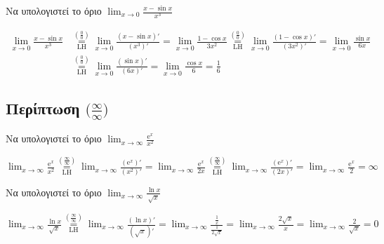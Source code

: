 \begin{example}
  Να υπολογιστεί το όριο $ \lim_{x \to 0} \frac{x- \sin{x}}{x^{3}} $
\end{example}
\begin{solution}
  \begin{align*}
    \lim_{x \to 0} \frac{x - \sin{x}}{x^{3}}
   &\overset{\left(\frac{0}{0}\right)}{\underset{\mathrm{LH}}{=}} \lim_{x \to 0}
   \frac{(x- \sin{x})'}{(x^{3})'} = \lim_{x \to 0} \frac{1 - \cos{x}}{3x^{2}}
   \overset{\left(\frac{0}{0}\right)}{\underset{\mathrm{LH}}{=}} \lim_{x \to 0}
   \frac{(1- \cos{x} )'}{(3x^{2})'} = \lim_{x \to 0} \frac{\sin{x}}{6x} \\
   &\overset{\left(\frac{0}{0}\right)}{\underset{\mathrm{LH}}{=}} \lim_{x \to 0}
   \frac{(\sin{x} )'}{(6x)'} = \lim_{x \to 0} \frac{\cos{x}}{6} = \frac{1}{6} 
  \end{align*}
\end{solution}


\subsection*{Περίπτωση $ \bigl(\frac{\infty}{\infty}\bigr) $}

\begin{example}
  Να υπολογιστεί το όριο $ \lim_{x \to \infty} \frac{\mathrm{e}^{x}}{x^{2}} $
\end{example}
\begin{solution}
  $ \lim_{x \to \infty} \frac{\mathrm{e}^{x}}{x^{2}}
  \overset{\left(\frac{\infty}{\infty}\right)}{\underset{\mathrm{LH}}{=}} \lim_{x \to
  \infty} \frac{(\mathrm{e}^{x} )'}{(x^{2})'} = \lim_{x \to \infty}
  \frac{\mathrm{e}^{x}}{2x}
  \overset{\left(\frac{\infty}{\infty}\right)}{\underset{\mathrm{LH}}{=}} 
  \lim_{x \to \infty} \frac{(\mathrm{e}^{x})'}{(2x)'} = \lim_{x \to \infty}
  \frac{\mathrm{e}^{x}}{2} = \infty
  $ 
\end{solution}

\begin{example}
  Να υπολογιστεί το όριο $ \lim_{x \to \infty} \frac{\ln{x}}{\sqrt{x}} $
\end{example}
\begin{solution}
  $ \lim_{x \to \infty} \frac{\ln{x}}{\sqrt{x}}
  \overset{\left(\frac{\infty}{\infty}\right)}{\underset{\mathrm{LH}}{=}} 
  \lim_{x \to \infty} \frac{(\ln{x} )'}{(\sqrt{x} )'} = \lim_{x \to \infty}
  \frac{\frac{1}{x}}{\frac{1}{2 \sqrt{x}}} = \lim_{x \to \infty} 
  \frac{2 \sqrt{x} }{x} = \lim_{x \to \infty} \frac{2}{\sqrt{x}} = 0
  $
\end{solution}


